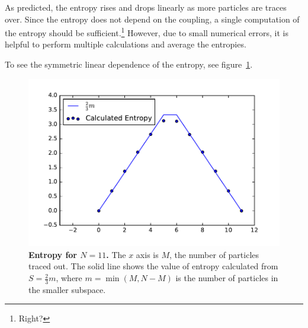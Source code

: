 \documentclass[12pt]{article} %
\begin{document}
As predicted, the entropy rises and drops linearly as more particles are traces over. Since the entropy does not depend on the coupling, a single computation of the entropy should be sufficient.\footnote{Right?} However, due to small numerical errors, it is helpful to perform multiple calculations and average the entropies. 

To see the symmetric linear dependence of the entropy, see figure~\ref{fig:N11pred_ent}.

\begin{figure}
	\centering
	\includegraphics[width=.5\textwidth]{N11pred_ent}
	\caption{\textbf{Entropy for $N=11$.} The $x$ axis is $M$, the number of particles traced out. The solid line shows the value of entropy calculated from $S=\frac{2}{3}m$, where $m = \min(M,N-M)$ is the number of particles in the smaller subspace. }
	\label{fig:N11pred_ent}
\end{figure}

\printbibliography
\end{document}
